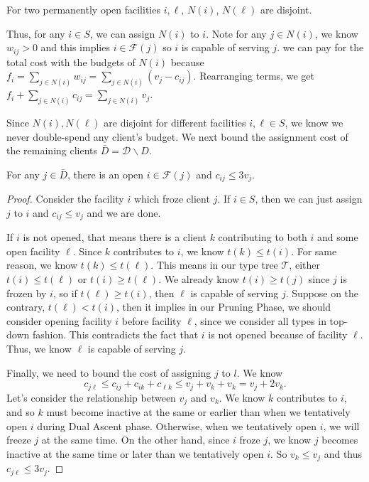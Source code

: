 \begin{fact}
For two permanently open facilities $i, \ell$, $N(i)$, $N(\ell)$ are disjoint.
\end{fact}

Thus, for any $i \in S$, we can assign $N(i)$ to $i$.
Note for any $j \in N(i)$, we know $w_{ij} > 0$ and this implies $i \in \mathcal{F}(j)$ so $i$ is capable of serving $j$.
we can pay for the total cost with the budgets of $N(i)$ because
%
$f_i = \sum_{j \in N(i)} w_{ij} = \sum_{j \in N(i)} (v_j - c_{ij})$.
%
Rearranging terms, we get
%
$f_i + \sum_{j \in N(i)} c_{ij} = \sum_{j \in N(i)} v_j$.

Since $N(i), N(\ell)$ are disjoint for different facilities $i, \ell \in S$, we know we never double-spend any client's budget.
%
We next bound the assignment cost of the remaining clients $\bar D = \mathcal{D} \backslash D$.
\begin{lem}
For any $j \in \bar D$, there is an open $i \in \mathcal{F}(j)$ and $c_{ij} \le 3v_j$.
\end{lem}
\begin{proof}
Consider the facility $i$ which froze client $j$. If $i \in S$, then we can just assign $j$ to $i$ and $c_{ij} \le v_j$ and we are done.

If $i$ is not opened, that means there is a client $k$ contributing to both $i$ and some open facility $\ell$. Since $k$ contributes to $i$, we know $t(k) \le t(i)$. For same reason, we know $t(k) \le t(\ell)$. This means in our type tree $\mathcal{T}$, either $t(i) \le t(\ell)$ or $t(i) \ge t(\ell)$.
We already know $t(i) \ge t(j)$ since $j$ is frozen by $i$, so if $t(\ell) \ge t(i)$, then $\ell$ is capable of serving $j$.
Suppose on the contrary, $t(\ell) < t(i)$, then it implies in our Pruning Phase, we should consider opening facility $i$ before facility $\ell$, since we consider all types in top-down fashion. This contradicts the fact that $i$ is not opened because of facility $\ell$.
Thus, we know $\ell$ is capable of serving $j$.

Finally, we need to bound the cost of assigning $j$ to $l$. We know
\[  c_{j\ell} \le c_{ij} + c_{ik} + c_{\ell k} \le v_j + v_k + v_k = v_j + 2v_k .   \]
Let's consider the relationship between $v_j$ and $v_k$.
We know $k$ contributes to $i$, and so $k$ must become inactive at the same or earlier than when we tentatively open $i$ during Dual Ascent phase.
Otherwise, when we tentatively open $i$, we will freeze $j$ at the same time.
On the other hand, since $i$ froze $j$, we know $j$ becomes inactive at the same time or later than we tentatively open $i$.
So $v_k \le v_j$ and thus
$c_{j\ell} \le 3v_j$.

\end{proof}

